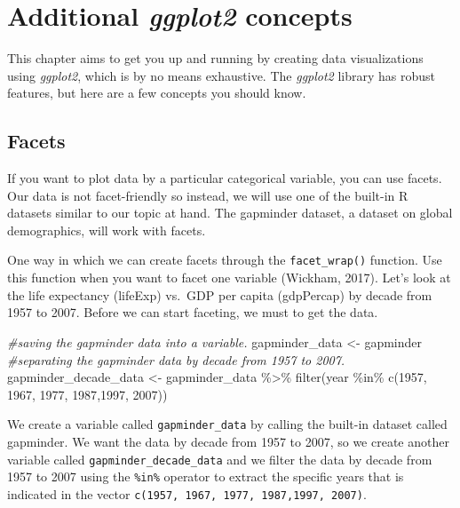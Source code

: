 \documentclass[
  krantz2]{krantz}
\makeatletter
\newenvironment{Shaded}{\begin{snugshade}}{\end{snugshade}}
\newcommand{\CommentTok}[1]{\textcolor[rgb]{0.37,0.37,0.37}{\textit{#1}}}
\newcommand{\DecValTok}[1]{\textcolor[rgb]{0.06,0.06,0.06}{#1}}
\newcommand{\FunctionTok}[1]{\textcolor[rgb]{0,0,0}{#1}}
\newcommand{\NormalTok}[1]{#1}
\newcommand{\OtherTok}[1]{\textcolor[rgb]{0.37,0.37,0.37}{#1}}
\newcommand{\SpecialCharTok}[1]{\textcolor[rgb]{0,0,0}{#1}}
\newenvironment{kframe}{%
\medskip{}
\setlength{\fboxsep}{.8em}
 \def\at@end@of@kframe{}%
 \ifinner\ifhmode%
  \def\at@end@of@kframe{\end{minipage}}%
  \begin{minipage}{\columnwidth}%
 \fi\fi%
 \def\FrameCommand##1{\hskip\@totalleftmargin \hskip-\fboxsep
 \colorbox{shadecolor}{##1}\hskip-\fboxsep
     \hskip-\linewidth \hskip-\@totalleftmargin \hskip\columnwidth}%
 \MakeFramed {\advance\hsize-\width
   \@totalleftmargin\z@ \linewidth\hsize
   \@setminipage}}%
 {\par\unskip\endMakeFramed%
 \at@end@of@kframe}
\renewenvironment{Shaded}{\begin{kframe}}{\end{kframe}}
\makeatother
\begin{document}
\hypertarget{more-ggplot2}{%
\section{\texorpdfstring{Additional \emph{ggplot2} concepts}{Additional ggplot2 concepts}}\label{more-ggplot2}}

This chapter aims to get you up and running by creating data visualizations using \emph{ggplot2}, which is by no means exhaustive. The \emph{ggplot2} library has robust features, but here are a few concepts you should know.

\hypertarget{facets}{%
\subsection{Facets}\label{facets}}

If you want to plot data by a particular categorical variable, you can use facets. Our data is not facet-friendly so instead, we will use one of the built-in R datasets similar to our topic at hand. The gapminder dataset, a dataset on global demographics, will work with facets.

One way in which we can create facets through the \texttt{facet\_wrap()} function. Use this function when you want to facet one variable (Wickham, 2017). Let's look at the life expectancy (lifeExp) vs.~GDP per capita (gdpPercap) by decade from 1957 to 2007. Before we can start faceting, we must to get the data.

\begin{Shaded}
\begin{Highlighting}[]
\CommentTok{\#saving the gapminder data into a variable.}
\NormalTok{gapminder\_data }\OtherTok{\textless{}{-}}\NormalTok{ gapminder }
\CommentTok{\#separating the gapminder data by decade from 1957 to 2007.}
\NormalTok{gapminder\_decade\_data }\OtherTok{\textless{}{-}}\NormalTok{ gapminder\_data }\SpecialCharTok{\%\textgreater{}\%}
  \FunctionTok{filter}\NormalTok{(year }\SpecialCharTok{\%in\%} \FunctionTok{c}\NormalTok{(}\DecValTok{1957}\NormalTok{, }\DecValTok{1967}\NormalTok{, }\DecValTok{1977}\NormalTok{, }\DecValTok{1987}\NormalTok{,}\DecValTok{1997}\NormalTok{, }\DecValTok{2007}\NormalTok{))}
\end{Highlighting}
\end{Shaded}

We create a variable called \texttt{gapminder\_data} by calling the built-in dataset called gapminder. We want the data by decade from 1957 to 2007, so we create another variable called \texttt{gapminder\_decade\_data} and we filter the data by decade from 1957 to 2007 using the \texttt{\%in\%} operator to extract the specific years that is indicated in the vector \texttt{c(1957,\ 1967,\ 1977,\ 1987,1997,\ 2007)}.
\end{document}
